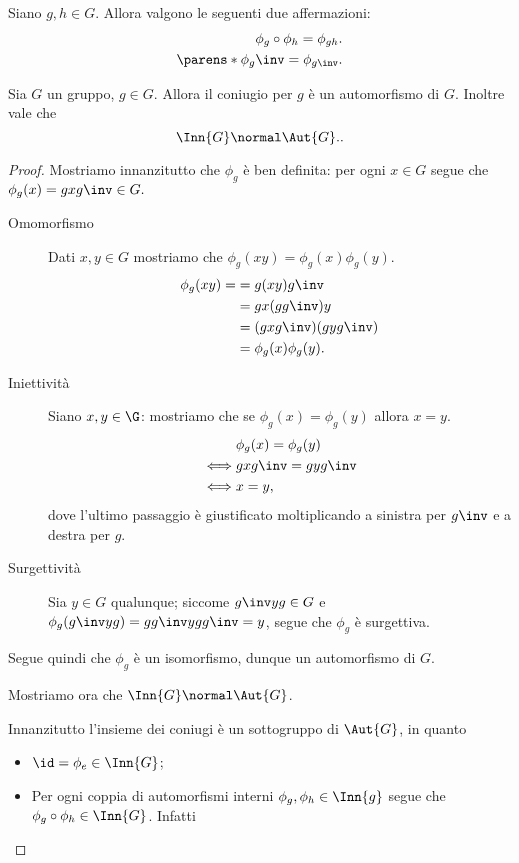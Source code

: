 \begin{lemma}
    Siano $g, h \in G$. Allora valgono le seguenti due affermazioni:
    \begin{align}
        \phi_g \circ \phi_h = \phi_{gh}.\\
        \parens*{\phi_g}\inv = \phi_{g\inv}.
    \end{align}
\end{lemma}

\begin{proposition}
    Sia $G$ un gruppo, $g \in G$. Allora il coniugio per $g$ è un automorfismo di $G$.
    Inoltre vale che \[
        \Inn{G} \normal \Aut{G}. 
    .\] 
\end{proposition}
\begin{proof}
    Mostriamo innanzitutto che $\phi_g$ è ben definita: per ogni $x \in G$ segue che $\phi_g(x) = gxg\inv \in G.$
    \begin{description}
        \item[Omomorfismo] Dati $x, y \in G$ mostriamo che $\phi_g(xy) = \phi_g(x)\phi_g(y)$.
            \begin{align*}
                \phi_g(xy) = &= g(xy)g\inv \\
                             &= gx(gg\inv)y \\
                             &= (gxg\inv)(gyg\inv)\\
                             &= \phi_g(x)\phi_g(y).
            \end{align*}
        \item[Iniettività]  Siano $x, y \in \G$: mostriamo che se $\phi_g(x) = \phi_g(y)$ allora $x = y$.
            \begin{align*}
                &\phi_g(x) = \phi_g(y)\\
                \iff &gxg\inv = gyg\inv\\
                \iff &x = y,
            \end{align*}
            dove l'ultimo passaggio è giustificato moltiplicando a sinistra per $g\inv$ e a destra per $g$.
        \item[Surgettività] Sia $y \in G$ qualunque; siccome $g\inv yg \in G$ e $\phi_g(g\inv y g) = gg\inv y gg\inv = y$, segue che $\phi_g$ è surgettiva.
    \end{description}
    Segue quindi che $\phi_g$ è un isomorfismo, dunque un automorfismo di $G$.

    Mostriamo ora che $\Inn{G} \normal \Aut{G}$.
    
    Innanzitutto l'insieme dei coniugi è un sottogruppo di $\Aut{G}$, in quanto
    \begin{itemize}
        \item $\id = \phi_e \in \Inn{G}$;
        \item Per ogni coppia di automorfismi interni $\phi_g, \phi_h \in \Inn{g}$ segue che $\phi_g \circ \phi_h \in \Inn{G}$. Infatti
    \end{itemize}
\end{proof}


